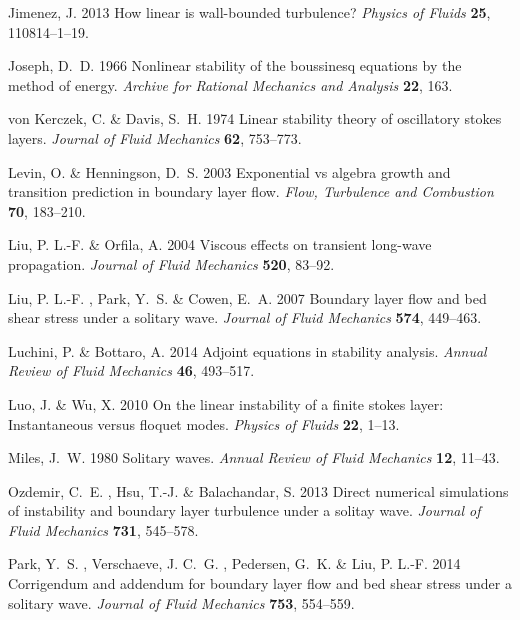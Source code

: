 \documentclass{jfm}
\begin{document}
\begin{thebibliography}{45}
{\sc Jimenez, J. } 2013 How linear is wall-bounded turbulence? {\em Physics of
  Fluids\/} {\bf 25}, 110814--1--19.

{\sc Joseph, D.~D. } 1966 Nonlinear stability of the boussinesq equations by
  the method of energy. {\em Archive for Rational Mechanics and Analysis\/}
  {\bf 22}, 163.

{\sc von Kerczek, C.  \& Davis, S.~H. } 1974 Linear stability theory of
  oscillatory stokes layers. {\em Journal of Fluid Mechanics\/} {\bf 62},
  753--773.

{\sc Levin, O.  \& Henningson, D.~S. } 2003 Exponential vs algebra growth and
  transition prediction in boundary layer flow. {\em Flow, Turbulence and
  Combustion\/} {\bf 70}, 183--210.

{\sc Liu, P. L.-F.  \& Orfila, A. } 2004 Viscous effects on transient long-wave
  propagation. {\em Journal of Fluid Mechanics\/} {\bf 520}, 83--92.

{\sc Liu, P. L.-F. , Park, Y.~S.  \& Cowen, E.~A. } 2007 Boundary layer flow
  and bed shear stress under a solitary wave. {\em Journal of Fluid
  Mechanics\/} {\bf 574}, 449--463.

{\sc Luchini, P.  \& Bottaro, A. } 2014 Adjoint equations in stability
  analysis. {\em Annual Review of Fluid Mechanics\/} {\bf 46}, 493--517.

{\sc Luo, J.  \& Wu, X. } 2010 On the linear instability of a finite stokes
  layer: Instantaneous versus floquet modes. {\em Physics of Fluids\/} {\bf
  22}, 1--13.

{\sc Miles, J.~W. } 1980 Solitary waves. {\em Annual Review of Fluid
  Mechanics\/} {\bf 12}, 11--43.

{\sc Ozdemir, C.~E. , Hsu, T.-J.  \& Balachandar, S. } 2013 Direct numerical
  simulations of instability and boundary layer turbulence under a solitay
  wave. {\em Journal of Fluid Mechanics\/} {\bf 731}, 545--578.

{\sc Park, Y.~S. , Verschaeve, J. C.~G. , Pedersen, G.~K.  \& Liu, P. L.-F. }
  2014 Corrigendum and addendum for boundary layer flow and bed shear stress
  under a solitary wave. {\em Journal of Fluid Mechanics\/} {\bf 753},
  554--559.


\end{thebibliography}
\end{document}
